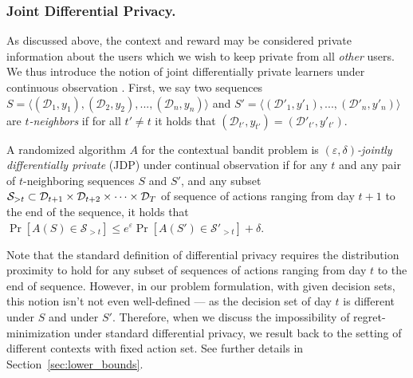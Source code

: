 \documentclass{article}
\newcommand{\os}[1]{\textcolor{red}{Or's comment:~\textbf{#1}}}
\begin{document}
\subsubsection{Joint Differential Privacy.}\label{sec:joint-dp}

As discussed above, the context and reward may be considered private
information about the users which we wish to keep private from all \emph{other} users. We thus introduce the notion of joint differentially private learners under continuous observation \citep[a combination of the two definitions given in][]{KearnsMechanismDesign2014,DworkContinualObservation2010}. First, we say two sequences $S = \langle (\mathcal{D}_1, y_1), (\mathcal{D}_2, y_2), ..., (\mathcal{D}_n, y_n) \rangle$ and $S' = \langle (\mathcal{D}'_1, y'_1), ..., (\mathcal{D}'_n, y'_n) \rangle$ are \emph{$t$-neighbors} if for all $t'\neq t$ it holds that $(\mathcal{D}_{t'},y_{t'}) = (\mathcal{D}'_{t'}, y'_{t'})$.

\begin{definition}
\label{def:joint-dp}
  A randomized algorithm $A$ for the contextual bandit problem is
  \emph{$(\varepsilon,\delta)$-jointly differentially private} (JDP) under continual observation if for any $t$ and any pair of $t$-neighboring sequences $S$ and $S'$, and any subset ${\cal S}_{>t} \subset \mathcal{D}_{t+1} \times \mathcal{D}_{t+2} \times \cdots \times \mathcal{D}_{T}$ of sequence of actions ranging from day $t+1$ to the end of the sequence, it holds that $\Pr[A(S)\in \mathcal{S}_{>t}] \leq e^\varepsilon\Pr[A(S')\in \mathcal{S}'_{>t}] +\delta$.
\end{definition}
Note that the standard definition of differential privacy requires the distribution proximity to hold for any subset of sequences of actions ranging from day $t$ to the end of sequence. However, in our problem formulation, with given decision sets, this notion isn't not even well-defined --- as the decision set of day $t$ is different under $S$ and under $S'$. Therefore, when we discuss the impossibility of regret-minimization under standard differential privacy, we result back to the setting of different contexts with fixed action set. See further details in Section~\ref{sec:lower_bounds}.
\end{document}
